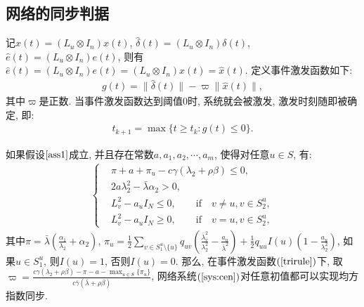 \subsection{网络的同步判据}
        记$\hat{x}(t)=(L_{u}\otimes I_n)x(t)$, $\hat{{\delta}}(t)=(L_{u}\otimes I_n){\delta}(t)$, $\hat{e}(t)=(L_u\otimes I_n)e(t)$,  则有$\hat{e}(t)=(L_u\otimes I_n)e(t)=(L_{u}\otimes I_n)x(t)=\hat{x}(t)$. 定义事件激发函数如下:
        \begin{align}\label{trirule}
            g(t)=\|\hat{{\delta}}(t)\|-\varpi\|\hat{x}(t)\|,
        \end{align}
        其中$\varpi$是正数. 当事件激发函数达到阈值$0$时, 系统就会被激发, 激发时刻随即被确定, 即:
        \begin{align*}
            t_{k+1}=\max\{t\ge t_k: g(t)\le 0\}.
        \end{align*}
        \begin{thm}\label{them}
        如果假设$\ref{ass1}$成立, 并且存在常数$a,a_1,a_2,\cdots,a_m$, 使得对任意$u\in S$, 有:
            \begin{align}\label{thm:1}
            \left\{
            \begin{aligned}
            &\pi+a+\pi_u-c\gamma(\lambda_2+\rho\beta)\leq0,\\
            &2a\lambda_2^2-\bar{\lambda}\alpha_2>0,\\
            &L^2_v-a_uI_N\leq 0, \quad\quad \text{if} \quad v\neq u, v\in S_2^u, \\
            &L^2_v-a_uI_N\geq 0, \quad\quad \text{if} \quad v= u, v\in S_2^u,
            \end{aligned}
            \right.
            \end{align}
        其中$\pi=\bar{\lambda}(\frac{\alpha_1}{\lambda_2}+\alpha_2)$, $\pi_u=\frac{1}{2}\sum_{v\in S_1^u\setminus\{u\}}q_{uv}(\frac{\bar{\lambda}^2_{v}}{\lambda_2^2}-\frac{a_u}{\bar{\lambda}^2})
        +\frac{1}{2}q_{uu}I(u)(1-\frac{a_u}{\lambda_2^2})$, 如果$u\in S_1^u$, 则$I(u)=1$, 否则$I(u)=0$.
        那么, 在事件激发函数$(\ref{trirule})$下, 取$\varpi=\frac{c\gamma(\lambda_2+\rho\beta)-\pi-a-\max_{u\in S}\{\pi_u\}}{c\bar\gamma(\bar\lambda+\rho\beta)}$, 网络系统$(\ref{sys:cen})$对任意初值都可以实现均方指数同步.
        \end{thm}

